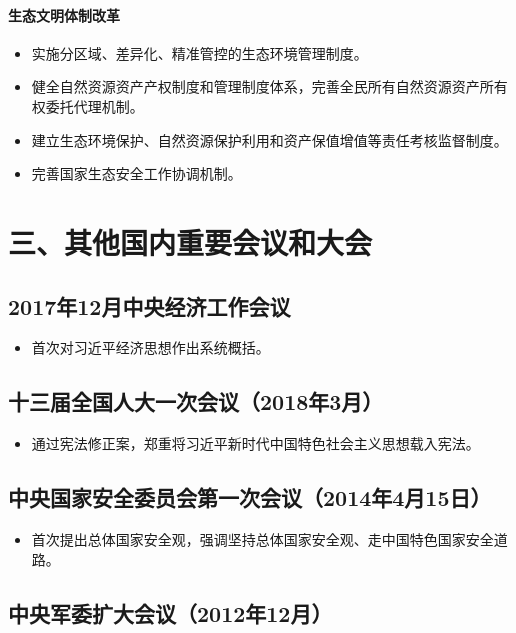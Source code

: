 \documentclass[12pt,a4paper]{ctexart}
\begin{document}
\paragraph{生态文明体制改革}

\begin{itemize}
\item 实施分区域、差异化、精准管控的生态环境管理制度。
\item 健全自然资源资产产权制度和管理制度体系，完善全民所有自然资源资产所有权委托代理机制。
\item 建立生态环境保护、自然资源保护利用和资产保值增值等责任考核监督制度。
\item 完善国家生态安全工作协调机制。
\end{itemize}

\section*{三、其他国内重要会议和大会}

\subsection*{2017年12月中央经济工作会议}

\begin{itemize}
\item 首次对习近平经济思想作出系统概括。
\end{itemize}

\subsection*{十三届全国人大一次会议（2018年3月）}

\begin{itemize}
\item 通过宪法修正案，郑重将习近平新时代中国特色社会主义思想载入宪法。
\end{itemize}

\subsection*{中央国家安全委员会第一次会议（2014年4月15日）}

\begin{itemize}
\item 首次提出总体国家安全观，强调坚持总体国家安全观、走中国特色国家安全道路。
\end{itemize}

\subsection*{中央军委扩大会议（2012年12月）}
\end{document}
